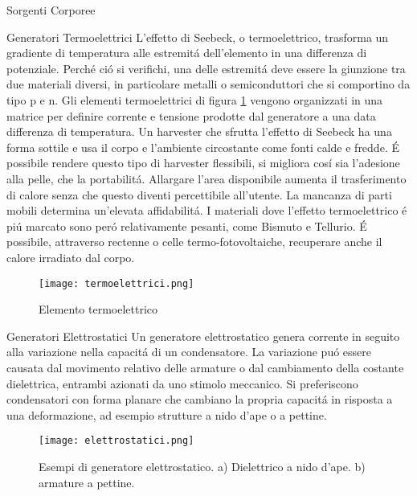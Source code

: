 \begin{section}{Sorgenti Corporee}
   \begin{subsection}{Generatori Termoelettrici}
    L'effetto di Seebeck, o termoelettrico, trasforma un gradiente di temperatura alle estremit\'a dell'elemento in una differenza di potenziale. Perch\'e ci\'o si verifichi, una delle estremit\'a deve essere la giunzione tra due materiali diversi, in particolare metalli o semiconduttori che si comportino da tipo p e n. Gli elementi termoelettrici di figura \ref{fig:termoelettrici} vengono organizzati in una matrice per definire corrente e tensione prodotte dal generatore a una data differenza di temperatura. Un harvester che sfrutta l'effetto di Seebeck ha una forma sottile e usa il corpo e l'ambiente circostante come fonti calde e fredde. \'E possibile rendere questo tipo di harvester flessibili, si migliora cos\'i sia l'adesione alla pelle, che la portabilit\'a. Allargare l'area disponibile aumenta il trasferimento di calore senza che questo diventi percettibile all'utente. La mancanza di parti mobili determina un'elevata affidabilit\'a. I materiali dove l'effetto termoelettrico \'e pi\'u marcato sono per\'o relativamente pesanti, come Bismuto e Tellurio. \'E possibile, attraverso rectenne o celle termo-fotovoltaiche, recuperare anche il calore irradiato dal corpo.
    \begin{figure}[H]
        \texttt{[image: termoelettrici.png]}
        \centering
        \caption{Elemento termoelettrico}
        \label{fig:termoelettrici}
    \end{figure}
   \end{subsection}

   \begin{subsection}{Generatori Elettrostatici}
    Un generatore elettrostatico genera corrente in seguito alla variazione nella capacit\'a di un condensatore. La variazione pu\'o essere causata dal movimento relativo delle armature o dal cambiamento della costante dielettrica, entrambi azionati da uno stimolo meccanico. Si preferiscono condensatori con forma planare che cambiano la propria capacit\'a in risposta a una deformazione, ad esempio strutture a nido d'ape o a pettine.
    \begin{figure}[H]
        \texttt{[image: elettrostatici.png]}
        \centering
        \caption{Esempi di generatore elettrostatico. a) Dielettrico a nido d'ape. b) armature a pettine.}
        \label{fig:elettristatici}
    \end{figure}
   \end{subsection}


\end{section}
